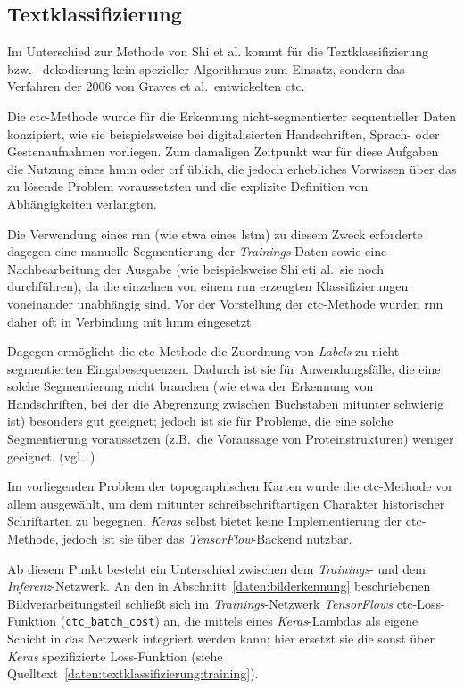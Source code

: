 \subsection{Textklassifizierung}
\label{daten:textklassifizierung}

Im Unterschied zur Methode von Shi et al. kommt für die Textklassifizierung bzw.\ -dekodierung kein spezieller
Algorithmus zum Einsatz, sondern das Verfahren der 2006 von Graves et al.\ entwickelten \gls{ctc}.

Die \gls{ctc}-Methode wurde für die Erkennung nicht-segmentierter sequentieller Daten konzipiert, wie sie beispielsweise
bei digitalisierten Handschriften, Sprach- oder Gestenaufnahmen vorliegen. Zum damaligen Zeitpunkt war für diese
Aufgaben die Nutzung eines \gls{hmm} oder \gls{crf} üblich, die jedoch erhebliches Vorwissen über das zu lösende Problem
voraussetzten und die explizite Definition von Abhängigkeiten verlangten.

Die Verwendung eines \gls{rnn} (wie etwa eines \gls{lstm}) zu diesem Zweck erforderte dagegen eine manuelle
Segmentierung der \textit{Trainings}-Daten sowie eine Nachbearbeitung der Ausgabe (wie beispielsweise Shi eti al.\ sie
noch durchführen), da die einzelnen von einem \gls{rnn} erzeugten Klassifizierungen voneinander unabhängig sind. Vor der
Vorstellung der \gls{ctc}-Methode wurden \gls{rnn} daher oft in Verbindung mit \gls{hmm} eingesetzt.

Dagegen ermöglicht die \gls{ctc}-Methode die Zuordnung von \textit{Labels} zu nicht-segmentierten Eingabesequenzen.
Dadurch ist sie für Anwendungsfälle, die eine solche Segmentierung nicht brauchen (wie etwa der Erkennung von
Handschriften, bei der die Abgrenzung zwischen Buchstaben mitunter schwierig ist) besonders gut geeignet; jedoch ist sie
für Probleme, die eine solche Segmentierung voraussetzen (z.B.\ die Voraussage von Proteinstrukturen) weniger geeignet.
(vgl.~\cite{graves2006})

Im vorliegenden Problem der topographischen Karten wurde die \gls{ctc}-Methode vor allem ausgewählt, um dem mitunter
schreibschriftartigen Charakter historischer Schriftarten zu begegnen. \textit{Keras} selbst bietet keine
Implementierung der \gls{ctc}-Methode, jedoch ist sie über das \textit{TensorFlow}-Backend nutzbar.

Ab diesem Punkt besteht ein Unterschied zwischen dem \textit{Trainings}- und dem \textit{Inferenz}-Netzwerk. An den
in Abschnitt~\ref{daten:bilderkennung} beschriebenen Bildverarbeitungsteil schließt sich im \textit{Trainings}-Netzwerk
\textit{TensorFlows} \gls{ctc}-Loss-Funktion (\texttt{ctc\_batch\_cost}) an, die mittels eines \textit{Keras}-Lambdas
als eigene Schicht in das Netzwerk integriert werden kann; hier ersetzt sie die sonst über \textit{Keras} spezifizierte
Loss-Funktion (siehe Quelltext~\ref{daten:textklassifizierung:training}).

